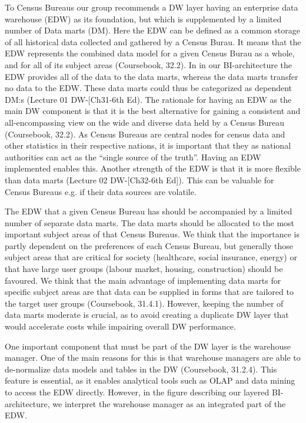 To Census Bureaus our group recommends a DW layer having an enterprise data warehouse (EDW) as its foundation, but which is supplemented by a limited number of Data marts (DM). Here the EDW can be defined as a common storage of all historical data collected and gathered by a Census Burau. It means that the EDW represents the combined data model for a given Census Burau as a whole, and for all of its subject areas (Coursebook, 32.2). In in our BI-architecture the EDW provides all of the data to the data marts, whereas the data marts transfer no data to the EDW. These data marts could thus be categorized as dependent DM:s (Lecture 01 DW-[Ch31-6th Ed). The rationale for having an EDW as the main DW component is that it is the best alternative for gaining a consistent and all-encompassing view on the wide and diverse data held by a Census Bureau (Coursebook, 32.2). As Census Bureaus are central nodes for census data and other statistics in their respective nations, it is important that they as national authorities can act as the “single source of the truth”. Having an EDW implemented enables this. Another strength of the EDW is that it is more flexible than data marts (Lecture 02 DW-[Ch32-6th Ed]). This can be valuable for Census Bureaus e.g. if their data sources are volatile.  

The EDW that a given Census Bureau has should be accompanied by a limited number of separate data marts. The data marts should be allocated to the most important subject areas of that Census Bureaus. We think that the importance is partly dependent on the preferences of each Census Bureau, but generally those subject areas that are critical for society (healthcare, social insurance, energy) or that have large user groups (labour market, housing, construction) should be favoured. We think that the main advantage of implementing data marts for specific subject areas are that data can be supplied in forms that are tailored to the target user groups  (Coursebook, 31.4.1). However, keeping the number of data marts moderate is crucial, as to avoid creating a duplicate DW layer that would accelerate costs while impairing overall DW performance.   

One important component that must be part of the DW layer is the warehouse manager.  One of the main reasons for this is that warehouse managers are able to de-normalize data models and tables in the DW (Coursebook, 31.2.4). This feature is essential, as it enables analytical tools such as OLAP and data mining to access the EDW directly. However, in the figure describing our layered BI-architecture, we interpret the warehouse manager as an integrated part of the EDW.  

